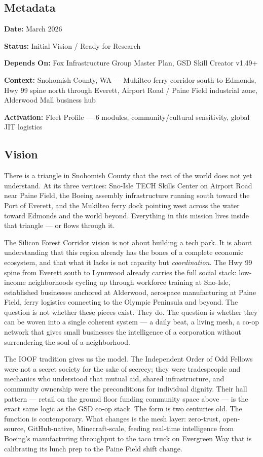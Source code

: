 \documentclass[11pt,letterpaper]{article}
\newcommand{\metafield}[2]{\textbf{\sffamily #1} #2\par}
\begin{document}
\subsection{Metadata}

\metafield{Date:}{March 2026}
\metafield{Status:}{Initial Vision / Ready for Research}
\metafield{Depends On:}{Fox Infrastructure Group Master Plan, GSD Skill Creator v1.49+}
\metafield{Context:}{Snohomish County, WA --- Mukilteo ferry corridor south to Edmonds, Hwy 99 spine north through Everett, Airport Road / Paine Field industrial zone, Alderwood Mall business hub}
\metafield{Activation:}{Fleet Profile --- 6 modules, community/cultural sensitivity, global JIT logistics}

\subsection{Vision}

There is a triangle in Snohomish County that the rest of the world does not yet understand. At its three vertices: Sno-Isle TECH Skills Center on Airport Road near Paine Field, the Boeing assembly infrastructure running south toward the Port of Everett, and the Mukilteo ferry dock pointing west across the water toward Edmonds and the world beyond. Everything in this mission lives inside that triangle --- or flows through it.

The Silicon Forest Corridor vision is not about building a tech park. It is about understanding that this region already has the bones of a complete economic ecosystem, and that what it lacks is not capacity but \emph{coordination}. The Hwy 99 spine from Everett south to Lynnwood already carries the full social stack: low-income neighborhoods cycling up through workforce training at Sno-Isle, established businesses anchored at Alderwood, aerospace manufacturing at Paine Field, ferry logistics connecting to the Olympic Peninsula and beyond. The question is not whether these pieces exist. They do. The question is whether they can be woven into a single coherent system --- a daily beat, a living mesh, a co-op network that gives small businesses the intelligence of a corporation without surrendering the soul of a neighborhood.

The IOOF tradition gives us the model. The Independent Order of Odd Fellows were not a secret society for the sake of secrecy; they were tradespeople and mechanics who understood that mutual aid, shared infrastructure, and community ownership were the preconditions for individual dignity. Their hall pattern --- retail on the ground floor funding community space above --- is the exact same logic as the GSD co-op stack. The form is two centuries old. The function is contemporary. What changes is the mesh layer: zero-trust, open-source, GitHub-native, Minecraft-scale, feeding real-time intelligence from Boeing's manufacturing throughput to the taco truck on Evergreen Way that is calibrating its lunch prep to the Paine Field shift change.
\end{document}
